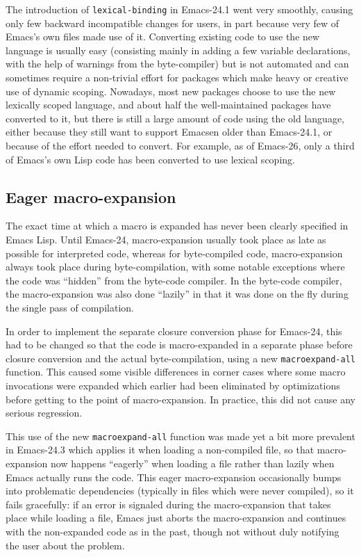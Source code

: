 \documentclass[format=acmsmall, review]{acmart}
\newcommand \Elisp {Emacs Lisp}
\begin{document}
The introduction of \texttt{lexical-binding} in Emacs-24.1 went very smoothly,
causing only few backward incompatible changes for users, in part because
very few of Emacs's own files made use of it.  Converting existing code to
use the new language is usually easy (consisting mainly in adding a few
variable declarations, with the help of warnings from the byte-compiler) but
is not automated and can sometimes require a non-trivial effort for packages
which make heavy or creative use of dynamic scoping.  Nowadays, most new
packages choose to use the new lexically scoped language, and about half the
well-maintained packages have converted to it, but there is still a large
amount of code using the old language, either because they still want to
support Emacsen older than Emacs-24.1, or because of the effort needed to
convert.  For example, as of Emacs-26, only a third of Emacs's own Lisp code
has been converted to use lexical scoping.


\subsection{Eager macro-expansion} %
\label{sec:eager-macro-expansion}

The exact time at which a macro is expanded has never been clearly specified
in \Elisp{}.  Until Emacs-24, macro-expansion usually took place as late as
possible for interpreted code, whereas for byte-compiled code,
macro-expansion always took place during byte-compilation, with some notable
exceptions where the code was ``hidden'' from the byte-code compiler.  In the
byte-code compiler, the macro-expansion was also done ``lazily'' in that it was
done on the fly during the single pass of compilation.

In order to implement the separate closure conversion phase for Emacs-24,
this had to be changed so that the code is macro-expanded in a separate
phase before closure conversion and the actual byte-compilation, using a new
\texttt{macroexpand-all} function.
This caused some visible differences in corner cases where some macro
invocations were expanded which earlier had been eliminated by optimizations before
getting to the point of macro-expansion. In practice, this did not cause
any serious regression.

This use of the new \texttt{macroexpand-all} function was made yet a bit
more prevalent in Emacs-24.3 which applies it when loading
a non-compiled file, so that macro-expansion now happens ``eagerly'' when
loading a file rather than lazily when Emacs actually runs the code.  This eager
macro-expansion occasionally bumps into problematic dependencies (typically
in files which were never compiled), so it fails gracefully: if an
error is signaled during the macro-expansion that takes place while loading
a file, Emacs just aborts the macro-expansion and continues with the non-expanded
code as in the past, though not without duly notifying the user about
the problem.
\end{document}
